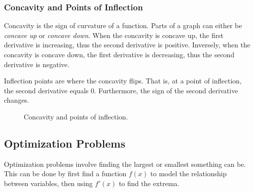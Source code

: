 \documentclass[12pt]{article}
\begin{document}
\subsubsection{Concavity and Points of Inflection}
\label{sec:concavity}
Concavity is the sign of curvature of a function. Parts of a graph can either be \textit{concave up} or \textit{concave down}. When the concavity is concave up, the first derivative is increasing, thus the second derivative is positive. Inversely, when the concavity is concave down, the first derivative is decreasing, thus the second derivative is negative.

Inflection points are where the concavity flips. That is, at a point of inflection, the second derivative equals $0$. Furthermore, the sign of the second derivative changes.

\begin{figure}[H]
	\begin{center}
		\caption{Concavity and points of inflection.}
		\label{fig:concavityinflection}
	\end{center}
\end{figure}

\subsection{Optimization Problems}
Optimization problems involve finding the largest or smallest something can be. This can be done by first find a function $f(x)$ to model the relationship between variables, then using $f'(x)$ to find the extrema.
\end{document}
